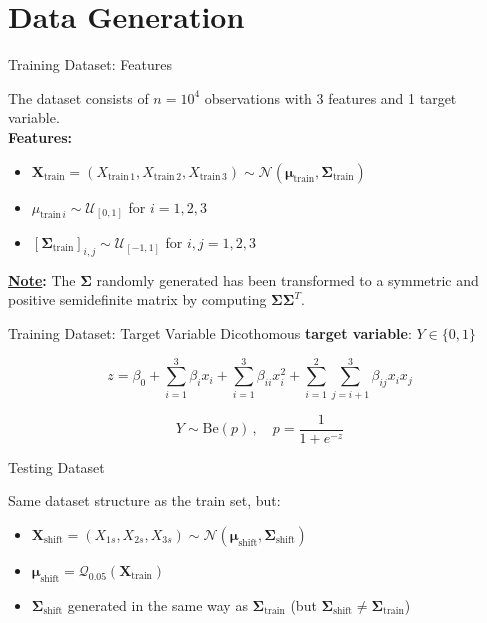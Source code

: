 \section{Data Generation}

\begin{frame}{Training Dataset: Features}

    The dataset consists of $n = 10^4$ observations with 3 features and 1 target variable.\\\vspace{0.3cm}
    \pause\textbf{Features:}
    \begin{itemize}
        \item $ \boldsymbol{X}_{\text{train}} = (X_{\text{train}\,1}, X_{\text{train}\,2}, X_{\text{train}\,3}) \sim \mathcal{N}(\boldsymbol{\mu}_{\text{train}}, \boldsymbol{\Sigma}_{\text{train}}) $
        \item $ \mu_{\text{train}\,i} \sim \mathcal{U}_{[0,1]} $ for $ i = 1, 2, 3 $
        \item $ [\boldsymbol{\Sigma}_{\text{train}}]_{i,j} \sim \mathcal{U}_{[-1,1]} $ for $ i, j = 1, 2, 3 $
    \end{itemize}
    \vspace{0.3cm}
    \textbf{\underline{Note}:} The $\boldsymbol{\Sigma}$ randomly generated has been transformed to a symmetric and positive semidefinite matrix by computing $\boldsymbol{\Sigma}\boldsymbol{\Sigma}^T$. 

\end{frame}

\begin{frame}{Training Dataset: Target Variable}
    Dicothomous \textbf{target variable}: $Y\in\{0,1\}$

    $$
        z = \beta_0 + \sum_{i=1}^3 \beta_i x_i + \sum_{i=1}^3 \beta_{ii} x_i^2 + \sum_{i=1}^{2} \sum_{j=i+1}^3 \beta_{ij} x_i x_j
    $$

    $$
        Y \sim \text{Be}(p)\,,\quad p = \frac{1}{1 + e^{-z}}
    $$
\end{frame}

\begin{frame}{Testing Dataset}

    Same dataset structure as the train set, but:
    \begin{itemize}
        \item $ \boldsymbol{X}_{\text{shift}} = (X_{1s}, X_{2s}, X_{3s}) \sim \mathcal{N}(\boldsymbol{\mu}_{\text{shift}}, \boldsymbol{\Sigma}_{\text{shift}}) $
        \item $ \boldsymbol{\mu}_{\text{shift}} = \mathcal{Q}_{0.05}(\boldsymbol{X}_{\text{train}})$
        \item $\boldsymbol{\Sigma}_{\text{shift}}$ generated in the same way as $\boldsymbol{\Sigma}_{\text{train}}$ (but $\boldsymbol{\Sigma}_{\text{shift}}\neq\boldsymbol{\Sigma}_{\text{train}}$)
    \end{itemize}
    
\end{frame}

